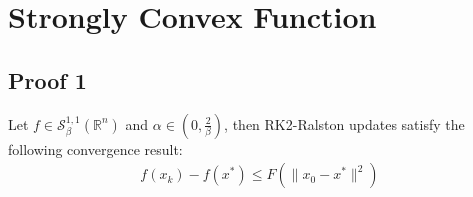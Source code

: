 \section{Strongly Convex Function}

\subsection{Proof 1}
\begin{thm}
 Let $f \in \mathcal{S}_{\beta}^{1,1}(\mathbb{R}^n)$ and $\alpha \in (0,\frac{2}{\beta})$, then RK2-Ralston updates satisfy the following convergence result:
 \begin{equation}
 \begin{aligned}
 f(x_k) - f(x^*) \leq F(\|x_0 - x^*\|^2)
 \end{aligned}
 \end{equation}
\end{thm}

